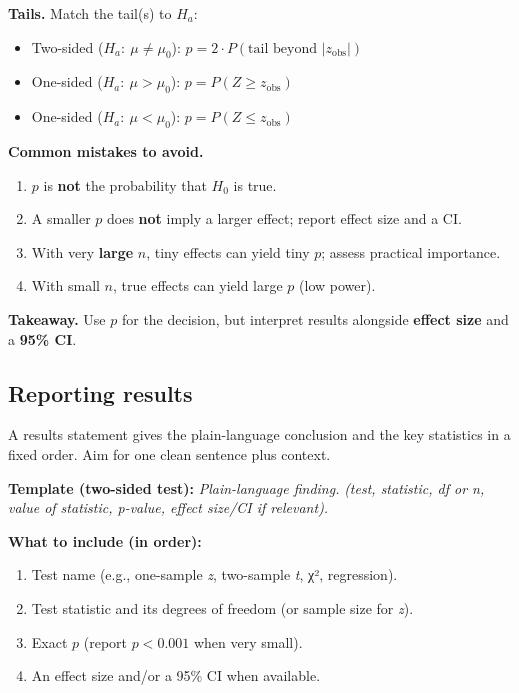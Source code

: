 \documentclass[
  letterpaper,
  DIV=11,
  numbers=noendperiod]{scrreprt}
\providecommand{\tightlist}{%
  \setlength{\itemsep}{0pt}\setlength{\parskip}{0pt}}
\begin{document}
\textbf{Tails.} Match the tail(s) to \(H_a\):

\begin{itemize}
\tightlist
\item
  Two-sided (\(H_a:\ \mu \neq \mu_0\)):
  \(p = 2\cdot P(\text{tail beyond }|z_{\text{obs}}|)\)\\
\item
  One-sided (\(H_a:\ \mu > \mu_0\)): \(p = P(Z \ge z_{\text{obs}})\)\\
\item
  One-sided (\(H_a:\ \mu < \mu_0\)): \(p = P(Z \le z_{\text{obs}})\)
\end{itemize}

\textbf{Common mistakes to avoid.}

\begin{enumerate}
\def\labelenumi{\arabic{enumi}.}
\tightlist
\item
  \(p\) is \textbf{not} the probability that \(H_0\) is true.
\item
  A smaller \(p\) does \textbf{not} imply a larger effect; report effect
  size and a CI.
\item
  With very \textbf{large} \(n\), tiny effects can yield tiny \(p\);
  assess practical importance.
\item
  With small \(n\), true effects can yield large \(p\) (low power).
\end{enumerate}

\textbf{Takeaway.} Use \(p\) for the decision, but interpret results
alongside \textbf{effect size} and a \textbf{95\% CI}.

\subsection{Reporting results}\label{reporting-results}

A results statement gives the plain-language conclusion and the key
statistics in a fixed order. Aim for one clean sentence plus context.

\textbf{Template (two-sided test):} \emph{Plain-language finding.}
\emph{(test, statistic, df or n, value of statistic, p-value, effect
size/CI if relevant).}

\textbf{What to include (in order):}

\begin{enumerate}
\def\labelenumi{\arabic{enumi}.}
\tightlist
\item
  Test name (e.g., one-sample \emph{z}, two-sample \emph{t}, χ²,
  regression).
\item
  Test statistic and its degrees of freedom (or sample size for
  \emph{z}).
\item
  Exact \(p\) (report \(p<0.001\) when very small).
\item
  An effect size and/or a 95\% CI when available.
\end{enumerate}
\end{document}
